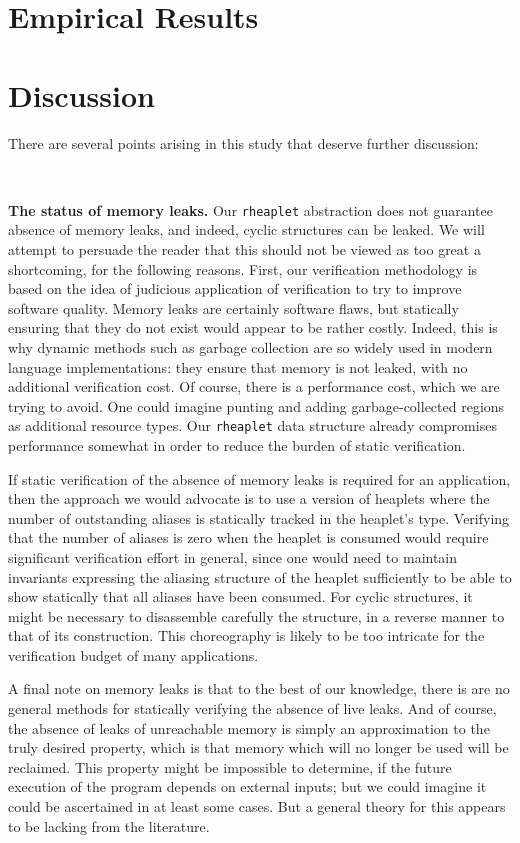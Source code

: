 \documentclass[9pt,natbib]{sigplanconf}
\begin{document}
\section{Empirical Results}
\label{sec:emp}

\section{Discussion}
\label{sec:future}

There are several points arising in this study that deserve further discussion:

\ 

\textbf{The status of memory leaks.} Our \texttt{rheaplet} abstraction
does not guarantee absence of memory leaks, and indeed, cyclic
structures can be leaked.  We will attempt to persuade the reader that
this should not be viewed as too great a shortcoming, for the
following reasons.  First, our verification methodology is based on
the idea of judicious application of verification to try to improve
software quality.  Memory leaks are certainly software flaws, but
statically ensuring that they do not exist would appear to be rather
costly.  Indeed, this is why dynamic methods such as garbage
collection are so widely used in modern language implementations: they
ensure that memory is not leaked, with no additional verification
cost.  Of course, there is a performance cost, which we are trying to
avoid.  One could imagine punting and adding garbage-collected regions
as additional resource types.  Our \texttt{rheaplet} data structure
already compromises performance somewhat in order to reduce the burden
of static verification.

If static verification of the absence of memory leaks is required for
an application, then the approach we would advocate is to use a
version of heaplets where the number of outstanding aliases is
statically tracked in the heaplet's type.  Verifying that the number
of aliases is zero when the heaplet is consumed would require
significant verification effort in general, since one would need to
maintain invariants expressing the aliasing structure of the heaplet
sufficiently to be able to show statically that all aliases have been
consumed.  For cyclic structures, it might be necessary to disassemble
carefully the structure, in a reverse manner to that of its
construction.  This choreography is likely to be too intricate for
the verification budget of many applications.

A final note on memory leaks is that to the best of our knowledge,
there is are no general methods for statically verifying the absence
of live leaks.  And of course, the absence of leaks of unreachable
memory is simply an approximation to the truly desired property, which
is that memory which will no longer be used will be reclaimed.  This
property might be impossible to determine, if the future execution of
the program depends on external inputs; but we could imagine it could
be ascertained in at least some cases.  But a general theory for this
appears to be lacking from the literature.
\end{document}

